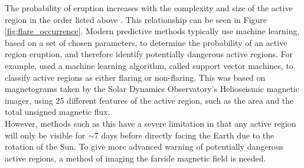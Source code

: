 \documentclass[11pt,a4paper,onecolumn]{report}
\begin{document}
The probability of eruption increases with the complexity and size of the
active region in the order listed above \citep{giovanelli_relations_1939}. This
relationship can be seen in Figure \ref{fig:flare_occurrence}. Modern
predictive methods typically use machine learning, based on a set of chosen
parameters, to determine the probability of an active region eruption, and therefore
identify potentially dangerous active regions. For example,
\citet{bobra_solar_2015} used a machine learning algorithm, called support
vector machines, to classify active regions as either flaring or non-flaring. This was
based on magnetograms taken by the Solar Dynamics Observatory's Helioseismic
magnetic imager, using 25 different features of the active region, such as the area and the
total unsigned magnetic flux. \\


However, methods such as this have a severe limitation in that any active region
will only be visible for \(\sim 7\) days before directly facing the Earth due to
the rotation of the Sun. To give more advanced warning of potentially dangerous
active regions, a method of imaging the farside magnetic field is needed. \\
\end{document}
